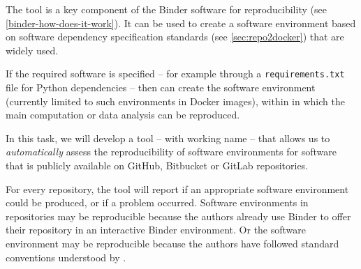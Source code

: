 \begin{task}[
  title=Towards quantifiable progress for reproducible software environments,
  id=repo2docker-checker,
  lead=SRL,
  PM=10,
  partners={MP}
  ]
  The \repotodocker{} tool is a key component of the Binder software for
  reproducibility (see \ref{binder-how-does-it-work}). It can be used to create
  a software environment based on software dependency specification standards
  (see \ref{sec:repo2docker}) that are widely used.

  If the required software is specified -- for example through a
  \texttt{requirements.txt} file for Python dependencies -- then \repotodocker{}
  can create the software environment (currently limited to such environments in
  Docker images), within in which the main computation or data analysis can be
  reproduced.

  In this task, we will develop a tool -- with working name
   -- that allows us to \emph{automatically}
  assess the reproducibility of software environments for software that is
  publicly available on GitHub, Bitbucket or GitLab repositories.

  For every repository, the  tool will report if an
  appropriate software environment could be produced, or if a problem occurred. Software
  environments in repositories may be reproducible because the authors already
  use Binder to offer their repository in an interactive Binder environment. Or
  the software environment may be reproducible because the authors have followed
  standard conventions understood by \repotodocker{}.


\end{task}
